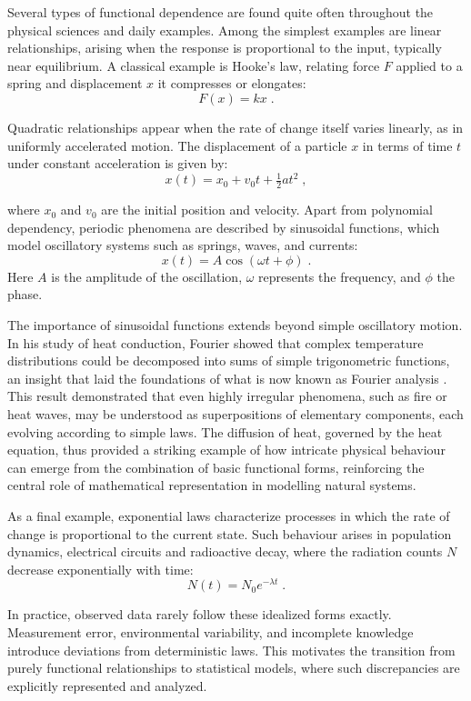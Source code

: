 \medskip

Several types of functional dependence are found quite often throughout the physical sciences and daily examples. Among the simplest examples are linear relationships, arising when the response is proportional to the input, typically near equilibrium. A classical example is Hooke’s law, relating force $F$ applied to a spring and displacement $x$ it compresses or elongates:
\[
    F(x) = kx \; .
\]

Quadratic relationships appear when the rate of change itself varies linearly, as in uniformly accelerated motion. The displacement of a particle $x$ in terms of time $t$ under constant acceleration is given by:
\[
    x(t) = x_0 + v_0t + \tfrac{1}{2}at^2 \; ,
\]

where $x_0$ and $v_0$ are the initial position and velocity. Apart from polynomial dependency, periodic phenomena are described by sinusoidal functions, which model oscillatory systems such as springs, waves, and currents:
\[
    x(t) = A\cos(\omega t + \phi) \; .
\]
Here $A$ is the amplitude of the oscillation, $\omega$ represents the frequency, and $\phi$ the phase.

\medskip

The importance of sinusoidal functions extends beyond simple oscillatory motion. In his study of heat conduction, Fourier showed that complex temperature distributions could be decomposed into sums of simple trigonometric functions, an insight that laid the foundations of what is now known as Fourier analysis \cite{fourier_1878_heat}. This result demonstrated that even highly irregular phenomena, such as fire or heat waves, may be understood as superpositions of elementary components, each evolving according to simple laws. The diffusion of heat, governed by the heat equation, thus provided a striking example of how intricate physical behaviour can emerge from the combination of basic functional forms, reinforcing the central role of mathematical representation in modelling natural systems.

\medskip

As a final example, exponential laws characterize processes in which the rate of change is proportional to the current state. Such behaviour arises in population dynamics, electrical circuits and radioactive decay, where the radiation counts $N$ decrease exponentially with time:
\[
    N(t) = N_0 e^{-\lambda t} \; .
\]

\medskip

In practice, observed data rarely follow these idealized forms exactly. Measurement error, environmental variability, and incomplete knowledge introduce deviations from deterministic laws. This motivates the transition from purely functional relationships to statistical models, where such discrepancies are explicitly represented and analyzed.

